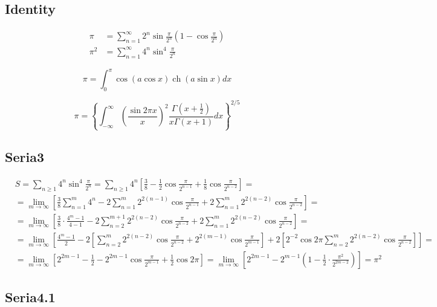 	\subsection{Identity}
	
	$$
	\begin{aligned}
		\pi & =\sum_{n=1}^{\infty} 2^n \sin \frac{\pi}{2^n}\left(1-\cos \frac{\pi}{2^n}\right) \\
		\pi^2 & =\sum_{n=1}^{\infty} 4^n \sin ^4 \frac{\pi}{2^n}
	\end{aligned}
	$$
	
	$$
	\pi=\int_0^\pi \cos (a \cos x) \operatorname{ch}(a \sin x) d x
	$$
	
	$$
	\pi=\left\{\int_{-\infty}^{\infty}\left(\frac{\sin 2 \pi x}{x}\right)^2 \frac{\Gamma\left(x+\frac{1}{2}\right)}{x \Gamma(x+1)} d x\right\}^{2 / 5}
	$$
	
	\subsection{Seria3}
	
	$$
	\begin{aligned}
		& S=\sum_{n \geq 1} 4^n \sin ^4 \frac{\pi}{2^n}=\sum_{n \geq 1} 4^n\left[\frac{3}{8}-\frac{1}{2} \cos \frac{\pi}{2^{n-1}}+\frac{1}{8} \cos \frac{\pi}{2^{n-2}}\right]= \\
		& =\lim _{m \rightarrow \infty}\left[\frac{3}{8} \sum_{n=1}^m 4^n-2 \sum_{n=1}^m 2^{2(n-1)} \cos \frac{\pi}{2^{n-1}}+2 \sum_{n=1}^m 2^{2(n-2)} \cos \frac{\pi}{2^{n-2}}\right]= \\
		& =\lim _{m \rightarrow \infty}\left[\frac{3}{8} \cdot \frac{4^m-1}{4-1}-2 \sum_{n=2}^{m+1} 2^{2(n-2)} \cos \frac{\pi}{2^{n-2}}+2 \sum_{n=1}^m 2^{2(n-2)} \cos \frac{\pi}{2^{n-2}}\right]= \\
		& =\lim _{m \rightarrow \infty}\left[\frac{4^m-1}{2}-2\left[\sum_{n=2}^m 2^{2(n-2)} \cos \frac{\pi}{2^{n-2}}+2^{2(m-1)} \cos \frac{\pi}{2^{m-1}}\right]+2\left[2^{-2} \cos 2 \pi \sum_{n=2}^m 2^{2(n-2)} \cos \frac{\pi}{2^{n-2}}\right]\right]= \\
		& =\lim _{m \rightarrow \infty}\left[2^{2 m-1}-\frac{1}{2}-2^{2 m-1} \cos \frac{\pi}{2^{m-1}}+\frac{1}{2} \cos 2 \pi\right]=\lim _{m \rightarrow \infty}\left[2^{2 m-1}-2^{m-1}\left(1-\frac{1}{2} \cdot \frac{\pi^2}{2^{2 m-2}}\right)\right]=\pi^2
	\end{aligned}
	$$
	
	\subsection{Seria4.1}
	
